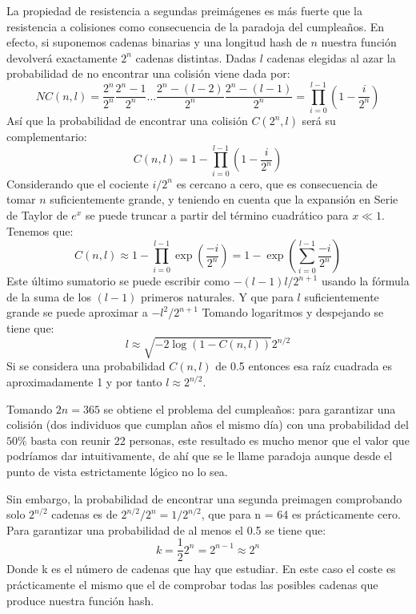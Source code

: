 La propiedad de resistencia a segundas preimágenes es  más fuerte que la resistencia a colisiones como consecuencia de la paradoja del cumpleaños. En efecto, si suponemos cadenas binarias y una longitud hash de $n$ nuestra función devolverá exactamente $2^{n}$ cadenas distintas. Dadas $l$ cadenas elegidas al azar la probabilidad de no encontrar una colisión viene dada por:
\begin{equation}
NC(n,l) = \frac{2^{n}}{2^{n}}\frac{2^{n}-1}{2^{n}}\ldots\frac{2^{n}-(l-2)}{2^{n}}\frac{2^{n}-(l-1)}{2^{n}} = \prod_{i=0}^{l-1}(1-\frac{i}{2^{n}})
\end{equation} 
Así que la probabilidad de encontrar una colisión $C(2^{n},l)$ será su complementario:
\begin{equation}
C(n,l) = 1-\prod_{i=0}^{l-1}(1-\frac{i}{2^{n}})
\end{equation}
Considerando que el cociente $i/2^{n}$ es cercano a cero, que es consecuencia de tomar $n$ suficientemente grande, y teniendo en cuenta que la expansión en Serie de Taylor de $e^{x}$ se puede truncar a partir del término cuadrático para $x \ll 1$. Tenemos que:
\begin{equation}
C(n,l) \approx 1- \prod_{i=0}^{l-1}\exp\left(\frac{-i}{2^{n}}\right) = 1- \exp\left(\sum_{i=0}^{l-1}\frac{-i}{2^{n}}\right)
\end{equation} 
Este último sumatorio se puede escribir como $-(l-1)l/2^{n+1}$ usando la fórmula de la suma de los $(l-1)$ primeros naturales. Y que para $l$ suficientemente grande se puede aproximar a $-l^{2}/2^{n+1}$
Tomando logaritmos y despejando se tiene que:
\begin{equation}
l \approx \sqrt{-2\log(1-C(n,l))}2^{n/2}
\end{equation}
Si se considera una probabilidad $C(n,l)$ de 0.5 entonces esa raíz cuadrada es aproximadamente 1 y por tanto $l \approx 2^{n/2}$. 

Tomando $2n = 365$ se obtiene el problema del cumpleaños: para garantizar una colisión (dos individuos que cumplan años el mismo día) con una probabilidad del $50\%$ basta con reunir 22 personas, este resultado es mucho menor que el valor que podríamos dar intuitivamente, de ahí que se le llame paradoja aunque desde el punto de vista estrictamente lógico no lo sea.

 Sin embargo, la probabilidad de encontrar una segunda preimagen comprobando solo $2^{n/2}$ cadenas es de 
$2^{n/2}/2^{n} = 1/2^{n/2}$, que para n = 64 es prácticamente cero. Para garantizar una probabilidad de al menos el 0.5 se tiene que:
\begin{equation}
k=\frac{1}{2}2^{n} = 2^{n-1} \approx 2^{n}
\end{equation}
Donde k es el número de cadenas que hay que estudiar. En este caso el coste es prácticamente el mismo que el de comprobar todas las posibles cadenas que produce nuestra función hash.

